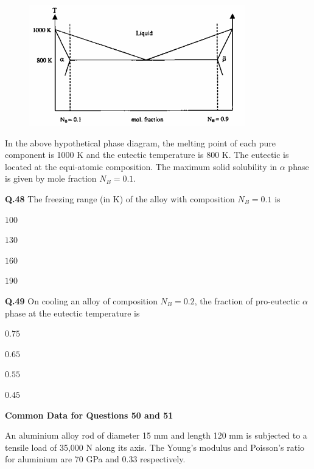 \documentclass[journal,12pt,onecolumn]{IEEEtran}
\theoremstyle{remark}
\begin{document}
\begin{enumerate}
    \begin{figure}[H]
        \centering
        \includegraphics[width=0.50\columnwidth]{figs/48.png}
        \label{fig:48.png}
    \end{figure}
    In the above hypothetical phase diagram, the melting point of each pure component is 1000 K and the eutectic temperature is 800 K. The eutectic is located at the equi-atomic composition. The maximum solid solubility in $\alpha$ phase is given by mole fraction $N_B = 0.1$.

    \textbf{Q.48} The freezing range (in K) of the alloy with composition $N_B=0.1$ is
    \hfill{}
    \begin{enumerate}[label=(\Alph*)]
    \begin{multicols}{4}
    \item $100$
    \item $130$
    \item $160$
    \item $190$
    \end{multicols}
    \end{enumerate}

    \textbf{Q.49} On cooling an alloy of composition $N_B=0.2$, the fraction of pro-eutectic $\alpha$ phase at the eutectic temperature is
    \hfill{}
    \begin{enumerate}[label=(\Alph*)]
    \begin{multicols}{4}
    \item $0.75$
    \item $0.65$
    \item $0.55$
    \item $0.45$
    \end{multicols}
    \end{enumerate}

    \textbf{Common Data for Questions 50 and 51}

    An aluminium alloy rod of diameter 15 mm and length 120 mm is subjected to a tensile load of 35,000 N along its axis. The Young's modulus and Poisson's ratio for aluminium are 70 GPa and 0.33 respectively.


\end{enumerate}
\end{document}

